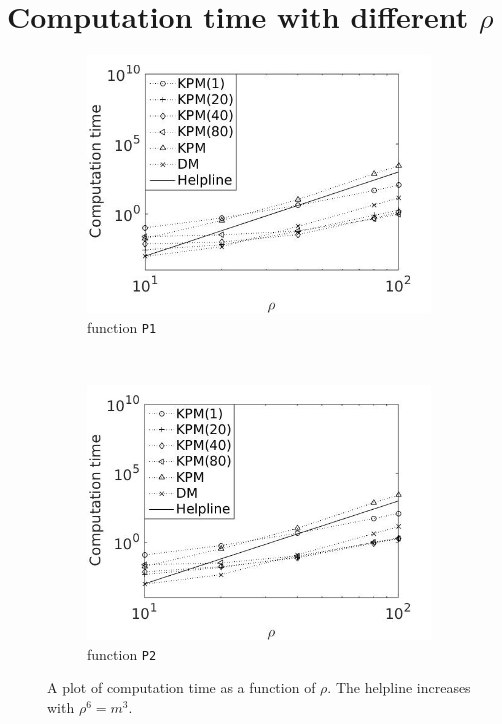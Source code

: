 \section{Computation time with different $\rho$} \label{sec:stimem}
\begin{figure}[H]
        \centering
        \begin{subfigure}[b]{0.45\textwidth}
                \includegraphics[width=\textwidth]{fig/n5timevsm1}
                \caption{function \texttt{P1}}
                \label{fig:timem1}
        \end{subfigure}%
        ~
        \begin{subfigure}[b]{0.45\textwidth}
                \includegraphics[width=\textwidth]{fig/n6timevsm2}
                \caption{function \texttt{P2}}
                \label{fig:timem2}
        \end{subfigure}
        \caption{A plot of computation time as a function of $\rho$. The helpline increases with $\rho^6 = m^3$.}\label{fig:timem}
\end{figure}
